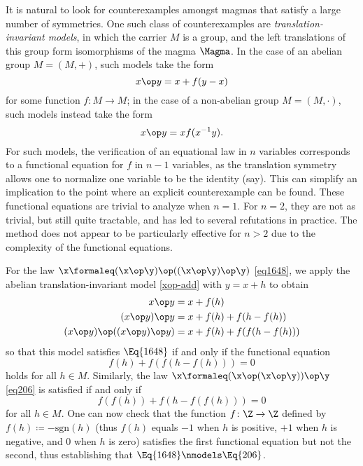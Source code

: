 It is natural to look for counterexamples amongst magmas that satisfy a large number of symmetries.  One such class of counterexamples are \emph{translation-invariant models}, in which the carrier $M$ is a group, and the left translations of this group form isomorphisms of the magma $\Magma$.  In the case of an abelian group $M = (M,+)$, such models take the form
\begin{equation}\label{xop-add}
  x \op y = x + f(y-x)
\end{equation}
for some function $f \colon M \to M$; in the case of a non-abelian group $M = (M,\cdot)$, such models instead take the form
\begin{equation}\label{xop-mul}
x \op y = x f(x^{-1} y).
\end{equation}
For such models, the verification of an equational law in $n$ variables corresponds to a functional equation for $f$ in $n-1$ variables, as the translation symmetry allows one to normalize one variable to be the identity (say). This can simplify an implication to the point where an explicit counterexample can be found.  These functional equations are trivial to analyze when $n=1$.  For $n=2$, they are not as trivial, but still quite tractable, and has led to several refutations in practice.  The method does not appear to be particularly effective for $n>2$ due to the complexity of the functional equations.

\begin{example}\label{abex}  For the law $\x \formaleq (\x \op \y) \op ((\x \op \y) \op \y)$ \eqref{eq1648}, we apply the abelian translation-invariant model \eqref{xop-add} with $y=x+h$ to obtain
\begin{align*}
  x \op y &= x + f(h) \\
  (x \op y) \op y &= x + f(h) + f(h-f(h)) \\
  (x \op y) \op ((x \op y) \op y) &= x + f(h) + f(f(h-f(h)))
\end{align*}
so that this model satisfies $\Eq{1648}$ if and only if the functional equation
$$f(h) + f(f(h-f(h))) = 0$$
holds for all $h \in M$.  Similarly, the law $\x \formaleq (\x \op (\x \op \y)) \op \y$ \eqref{eq206} is satisfied if and only if
$$ f(f(h)) + f(h - f(f(h))) = 0$$
for all $h \in M$.  One can now check that the function $f \colon \Z \to \Z$ defined by $f(h) \coloneqq - \mathrm{sgn}(h)$ (thus $f(h)$ equals $-1$ when $h$ is positive, $+1$ when $h$ is negative, and $0$ when $h$ is zero) satisfies the first functional equation but not the second, thus establishing that $\Eq{1648} \nmodels \Eq{206}$.
\end{example}

